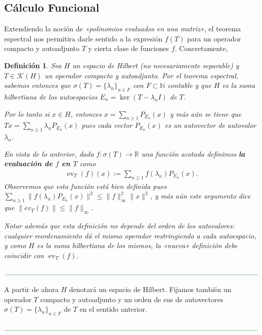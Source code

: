\documentclass[11pt]{report}
\theoremstyle{colored}
\newtheorem{definition}{Definición}[section]
\newcommand{\N}{\mathbb{N}}
\newcommand{\R}{\mathbb{R}}
\newcommand{\ev}{\operatorname{ev}}
\newcommand{\paint}[1]{\color{color}{#1}}
\newcommand{\paintline}{\begin{center}
$\paint{
\rule{400pt}{0.5pt}
}$
\vspace{10pt}
\end{center}}
\begin{document}
\subsection{Cálculo Funcional}

Extendiendo la noción de \textit{«polinomios evaluados en una matriz»}, el teorema espectral nos permitira darle sentido a la expresión $f(T)$ para un operador compacto y autoadjunto $T$ y cierta clase de funciones $f$. Concretamente, 

\begin{definition} Sea $H$ un espacio de Hilbert (no necesariamente separable) y $T \in \mathscr{K}(H)$ un operador compacto y autoadjunto. Por el teorema espectral, sabemos entonces que $\sigma(T) = \{\lambda_n\}_{n \in F}$ con $F \subset \N$ contable y que $H$ es la suma hilbertiana de los autoespacios $E_n = \ker(T-\lambda_n I)$ de $T$.

Por lo tanto si $x \in H$, entonces $x = \sum_{n \geq 1}P_{E_n}(x)$ y más aún se tiene que $Tx = \sum_{n \geq 1}\lambda_n P_{E_n}(x)$ pues cada vector $P_{E_n}(x)$ es un autovector de autovalor $\lambda_n$.

En vista de lo anterior, dada $f : \sigma(T) \to \R$ una función acotada definimos \textbf{la evaluación de $f$ en $T$} como
\begin{align*}
\ev_T(f)(x) := \sum_{n \geq 1}f(\lambda_n)P_{E_n}(x).
\end{align*}
Observemos que esta función está bien definida pues $\sum_{n \geq 1}\|f(\lambda_n)P_{E_n}(x)\|^2 \leq \|f\|_\infty^2 \|x\|^2$, y más aún este argumento dice que $\|ev_T(f)\| \leq \|f\|_\infty$. 

Notar además que esta definición no depende del orden de los autovalores: cualquier reordenamiento dá el mismo operador restringiendo a cada autoespacio, y como $H$ es la suma hilbertiana de los mismos, la \textit{«nueva»} definición debe coincidir con $\ev_T(f)$.
\end{definition}

\paintline
A partir de ahora $H$ denotará un espacio de Hilbert. Fijamos también un operador $T$ compacto y autoadjunto y un orden de sus de autovectores $\sigma(T) = \{\lambda_n\}_{n \in F}$ de $T$ en el sentido anterior.
\paintline
\end{document}
